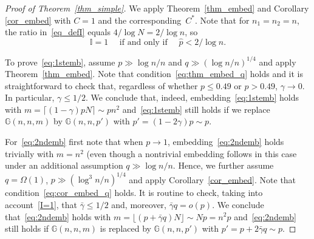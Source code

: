 \documentclass[12pt,reqno]{amsart}
\newcommand{\G} {\mathbb G}
\newcommand{\I} {\mathbb I}
\theoremstyle{definition}
\begin{document}
\medskip

\begin{proof}[Proof of Theorem~\ref{thm_simple}]
	We apply Theorem~\ref{thm_embed} and Corollary \ref{cor_embed} with $C=1$ and the corresponding~$C^*$. Note that for $n_1=n_2=n$, the ratio in~\eqref{eq_defI} equals  $4/\log N = 2/\log n$, so
\begin{equation}
  \label{I=1}
\I=1\quad\text{ if and only if }\quad\hat p<2/\log n.
\end{equation}

  To prove~\eqref{eq:1stemb}, assume $p\gg\log n/n$ and $q \gg \left( \log n/n \right)^{1/4}$ and apply Theorem~\ref{thm_embed}.
  Note that  condition~\eqref{eq:thm_embed_q} holds and it is straightforward to check that, regardless of whether $p \le 0.49$ or $p > 0.49$, $\gamma \to 0$. In particular, $\gamma \le 1/2$. We conclude that, indeed, embedding~\eqref{eq:1stemb} holds with $m = \lceil (1 - \gamma)p N \rceil \sim pn^2$ and~\eqref{eq:1stemb} still holds if we replace $\G(n,n,m)$ by $\G(n,n,p')$ with $p' = (1 - 2\gamma)p \sim p$.

  For~\eqref{eq:2ndemb} first note that when $p \to 1$, embedding~\eqref{eq:2ndemb} holds trivially with $m = n^2$ (even though a nontrivial embedding follows in this case under an additional assumption $q \gg \log n/n$. Hence, we further assume $q = \Omega(1)$, $p\gg\left(\log^3 n / n\right)^{1/4}$ and apply Corollary~\ref{cor_embed}. Note that condition~\eqref{eq:cor_embed_q} holds. It is routine to check, taking into account~\eqref{I=1}, that $\bar\gamma\le 1/2$ and, moreover, $\bar\gamma q = o(p)$. We conclude that~\eqref{eq:2ndemb} holds with $m = \lfloor(p + \bar\gamma q)N \rfloor \sim Np = n^2p$ and~\eqref{eq:2ndemb} still holds if $\G(n,n,m)$ is replaced by $\G(n,n,p')$ with $p' = p + 2 \bar \gamma q \sim p$.
\end{proof}
\end{document}
